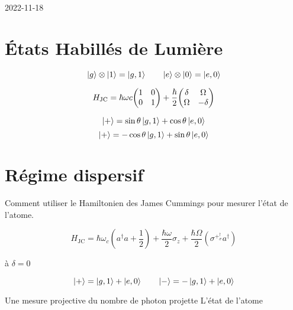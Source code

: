


2022-11-18

\section*{États Habillés de Lumière}


\[ \ket{g} \otimes \ket{1} = \ket{g,1} \qquad \ket{e} \otimes \ket{0} = \ket{e,0} \]

\[ H_{\text{JC}} = \hbar \omega c \mqty(1 & 0 \\ 0  &1) + \frac{\hbar}{2} \mqty(\delta & \Omega \\ \Omega & -\delta)  \]

\[ \ket{+} = \sin\theta \ket{g,1} + \cos\theta \ket{e,0} \]
\[ \ket{+} = -\cos\theta \ket{g,1} + \sin\theta \ket{e,0} \]


\section*{Régime dispersif}

Comment utiliser le Hamiltonien des James Cummings pour mesurer l'état de l'atome.


\[ H_{\text{JC}} = \hbar \omega_c \left( a ^{\dagger} a + \frac{1}{2}  \right) + \frac{\hbar \omega}{2} \sigma_z + \frac{\hbar\Omega}{2} \left( \sigma^{+} ^{\dagger} _ \sigma a ^{\dagger} \right) 	   \]

à $\delta = 0$

\[ \ket{+} = \ket{g,1} + \ket{e,0} \qquad \ket{-} = - \ket{g,1} + \ket{e, 0} \]

\begin{tcolorbox}[title=]
	Une mesure projective du nombre de photon projette L'état de l'atome
	 
\end{tcolorbox}







